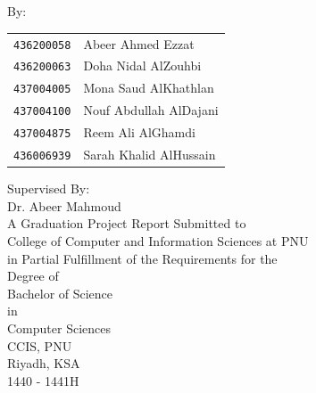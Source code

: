 \documentclass[12pt, oneside, a4paper]{book}
\begin{document}
	

	\begin{titlepage}
	\begin{center}
		\hspace{0pt}\\
		\vspace{4cm}
		{}\\			
			\vspace{2cm}
			By: \\
			\begin{table}[H]
				\begin{center}
					\begin{tabular}{rl}		
						\texttt{436200058} & Abeer Ahmed Ezzat 
						\\
						\texttt{436200063} & Doha Nidal AlZouhbi
						\\
						\texttt{437004005} & Mona Saud AlKhathlan  
						\\
						\texttt{437004100} & Nouf Abdullah AlDajani 
						\\	
						\texttt{437004875} & Reem Ali AlGhamdi
						\\
						\texttt{436006939} & Sarah Khalid AlHussain 
					\end{tabular}
				\end{center}
			\end{table}
			
			Supervised By: \\
			\Large{Dr. Abeer Mahmoud}\\
			
			
			
			\vfill \normalsize
			A Graduation Project Report Submitted to \\
			College of Computer and Information Sciences at PNU \\
			in Partial Fulfillment of the Requirements for the \\
			Degree of \\
			Bachelor of Science \\
			in \\
			Computer Sciences \\[5ex]
			CCIS, PNU \\
			Riyadh, KSA \\
			1440 - 1441H \\
		\end{center}
	\end{titlepage}
	\newpage
\end{document}
